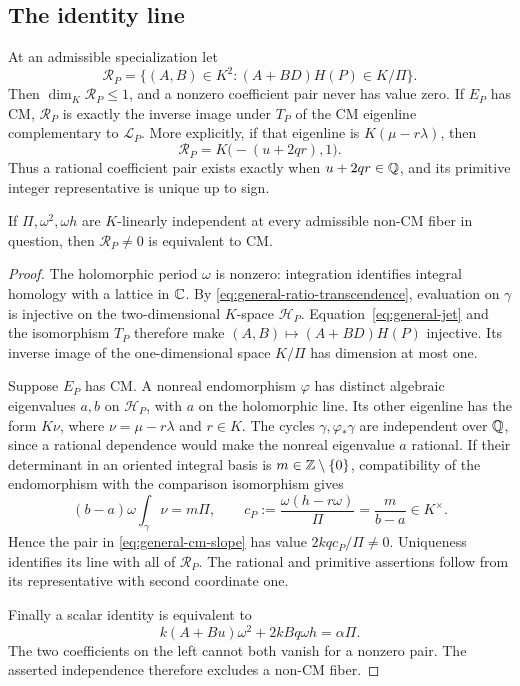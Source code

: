 \subsection{The identity line}
\begin{theorem}\label{thm:general-identity-line}
At an admissible specialization let
\[
 \mathcal R_P=\{(A,B)\in K^2:(A+BD)H(P)\in K/\Pi\}.
\]
Then $\dim_K\mathcal R_P\le1$, and a nonzero coefficient pair never
has value zero. If $E_P$ has CM, $\mathcal R_P$ is exactly the
inverse image under $T_P$ of the CM eigenline complementary to
$\mathcal L_P$. More explicitly, if that eigenline is
$K(\mu-r\lambda)$, then
\begin{equation}\label{eq:general-cm-slope}
 \mathcal R_P=K\bigl(-(u+2qr),1\bigr).
\end{equation}
Thus a rational coefficient pair exists exactly when
$u+2qr\in\mathbb Q$, and its primitive integer representative is unique
up to sign.

If $\Pi,\omega^2,\omega h$ are $K$-linearly independent at every
admissible non-CM fiber in question, then
$\mathcal R_P\ne0$ is equivalent to CM.
\end{theorem}
\begin{proof}
The holomorphic period $\omega$ is nonzero: integration identifies
integral homology with a lattice in $\mathbb C$. By
\eqref{eq:general-ratio-transcendence}, evaluation on $\gamma$ is
injective on the two-dimensional $K$-space $\mathcal H_P$.
Equation~\eqref{eq:general-jet} and the isomorphism $T_P$ therefore
make $(A,B)\mapsto(A+BD)H(P)$ injective. Its inverse image of the
one-dimensional space $K/\Pi$ has dimension at most one.

Suppose $E_P$ has CM. A nonreal endomorphism $\varphi$ has distinct
algebraic eigenvalues $a,b$ on $\mathcal H_P$, with $a$ on the
holomorphic line. Its other eigenline has the form
$K\nu$, where $\nu=\mu-r\lambda$ and $r\in K$. The cycles
$\gamma,\varphi_*\gamma$ are independent over $\mathbb Q$, since a
rational dependence would make the nonreal eigenvalue $a$ rational.
If their determinant in an oriented integral basis is
$m\in\mathbb Z\setminus\{0\}$, compatibility of the endomorphism with
the comparison isomorphism gives
\begin{equation}\label{eq:general-cm-determinant}
 (b-a)\omega\int_\gamma\nu=m\Pi,\qquad
 c_P:=\frac{\omega(h-r\omega)}{\Pi}
       =\frac{m}{b-a}\in K^\times.
\end{equation}
Hence the pair in \eqref{eq:general-cm-slope} has value
$2kq c_P/\Pi\ne0$. Uniqueness identifies its line with all of
$\mathcal R_P$. The rational and primitive assertions follow from
its representative with second coordinate one.

Finally a scalar identity is equivalent to
\begin{equation}\label{eq:general-period-relation}
 k(A+Bu)\omega^2+2kBq\omega h=\alpha\Pi.
\end{equation}
The two coefficients on the left cannot both vanish for a nonzero
pair. The asserted independence therefore excludes a non-CM fiber.
\end{proof}

